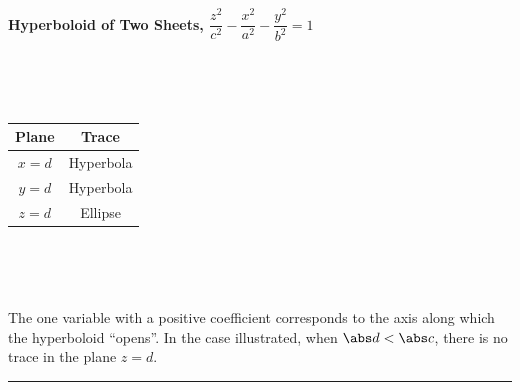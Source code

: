 \noindent\textbf{Hyperboloid of Two Sheets, \quad$\dfrac{z^2}{c^2}-\dfrac{x^2}{a^2}-\dfrac{y^2}{b^2}=1$}\bigskip\\
\noindent
\begin{minipage}{1.1\linewidth}
 \noindent%
 \begin{minipage}[c]{.3\linewidth}
  \mbox{}\\
 \end{minipage}%
 \begin{minipage}[c]{.22\linewidth}
  \mbox{}\\
  \begin{tabular}{cc}
   \textbf{Plane} & \textbf{Trace} \\\midrule
   $x=d$ & Hyperbola\\
   $y=d$ & Hyperbola\\
   $z=d$ & Ellipse
  \end{tabular}
 \end{minipage}%
 \begin{minipage}[c]{.45\linewidth}
  \mbox{}\\
 \end{minipage}
 \bigskip\\
 \begin{minipage}{.75\linewidth}
  The one variable with a positive coefficient corresponds to the axis along which the hyperboloid ``opens''. In the case illustrated, when $\abs d<\abs c$, there is no trace in the plane $z=d$.
 \end{minipage}
\end{minipage}

\noindent\rule{\linewidth}{.5pt}

